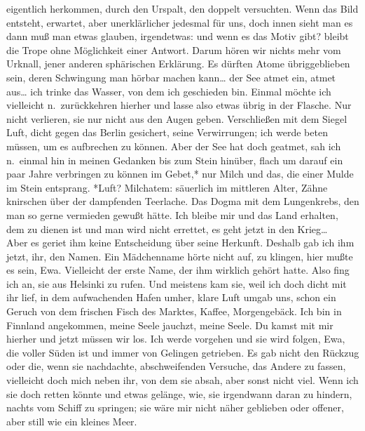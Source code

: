 \documentclass[
]{article}
\begin{document}
eigentlich herkommen, durch den Urspalt, den doppelt versuchten. Wenn
das Bild entsteht, erwartet, aber unerklärlicher jedesmal für uns, doch
innen sieht man es dann muß man etwas glauben, irgendetwas: und wenn es
das Motiv gibt? bleibt die Trope ohne Möglichkeit einer Antwort. Darum
hören wir nichts mehr vom Urknall, jener anderen sphärischen Erklärung.
Es dürften Atome übriggeblieben sein, deren Schwingung man hörbar machen
kann\ldots{} der See atmet ein, atmet aus\ldots{} ich trinke das Wasser,
von dem ich geschieden bin. Einmal möchte ich vielleicht n.~zurückkehren
hierher und lasse also etwas übrig in der Flasche. Nur nicht verlieren,
sie nur nicht aus den Augen geben. Verschließen mit dem Siegel Luft,
dicht gegen das Berlin gesichert, seine Verwirrungen; ich werde beten
müssen, um es aufbrechen zu können. Aber der See hat doch geatmet, sah
ich n.~einmal hin in meinen Gedanken bis zum Stein hinüber, flach um
darauf ein paar Jahre verbringen zu können im Gebet,* nur Milch und das,
die einer Mulde im Stein entsprang. *Luft? Milchatem: säuerlich im
mittleren Alter, Zähne knirschen über der dampfenden Teerlache. Das
Dogma mit dem Lungenkrebs, den man so gerne vermieden gewußt hätte. Ich
bleibe mir und das Land erhalten, dem zu dienen ist und man wird nicht
errettet, es geht jetzt in den Krieg\ldots{}\\
Aber es geriet ihm keine Entscheidung über seine Herkunft. Deshalb gab
ich ihm jetzt, ihr, den Namen. Ein Mädchenname hörte nicht auf, zu
klingen, hier mußte es sein, Ewa. Vielleicht der erste Name, der ihm
wirklich gehört hatte. Also fing ich an, sie aus Helsinki zu rufen. Und
meistens kam sie, weil ich doch dicht mit ihr lief, in dem aufwachenden
Hafen umher, klare Luft umgab uns, schon ein Geruch von dem frischen
Fisch des Marktes, Kaffee, Morgengebäck. Ich bin in Finnland angekommen,
meine Seele jauchzt, meine Seele. Du kamst mit mir hierher und jetzt
müssen wir los. Ich werde vorgehen und sie wird folgen, Ewa, die voller
Süden ist und immer von Gelingen getrieben. Es gab nicht den Rückzug
oder die, wenn sie nachdachte, abschweifenden Versuche, das Andere zu
fassen, vielleicht doch mich neben ihr, von dem sie absah, aber sonst
nicht viel. Wenn ich sie doch retten könnte und etwas gelänge, wie, sie
irgendwann daran zu hindern, nachts vom Schiff zu springen; sie wäre mir
nicht näher geblieben oder offener, aber still wie ein kleines Meer.
\end{document}
